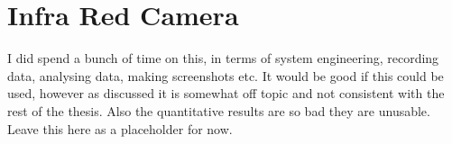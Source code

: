 \chapter{Infra Red Camera}
\label{chapter:flir}

I did spend a bunch of time on this, in terms of system engineering, recording data, analysing
data, making screenshots etc.  It would be good if this could be used, however as discussed it is
somewhat off topic and not consistent with the rest of the thesis.  Also the quantitative
results are so bad they are unusable.  Leave this here as a placeholder for now.